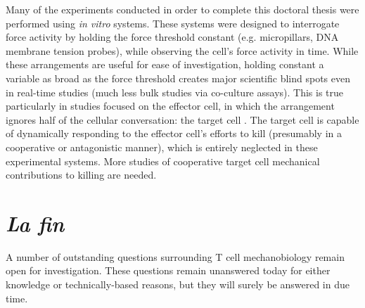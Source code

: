 Many of the experiments conducted in order to complete this doctoral thesis were performed using \textit{in vitro} systems. These systems were designed to interrogate force activity by holding the force threshold constant (e.g. micropillars, DNA membrane tension probes), while observing the cell's force activity in time. While these arrangements are useful for ease of investigation, holding constant a variable as broad as the force threshold creates major scientific blind spots even in real-time studies (much less bulk studies via co-culture assays). This is true particularly in studies focused on the effector cell, in which the arrangement ignores half of the cellular conversation: the target cell \cite{Tello-lafoz2021}. The target cell is capable of dynamically responding to the effector cell's efforts to kill (presumably in a cooperative or antagonistic manner), which is entirely neglected in these experimental systems.  More studies of cooperative target cell mechanical contributions to killing are needed.

\section{\textit{La fin}}

A number of outstanding questions surrounding T cell mechanobiology remain open for investigation. These questions remain unanswered today for either knowledge or technically-based reasons, but they will surely be answered in due time.
